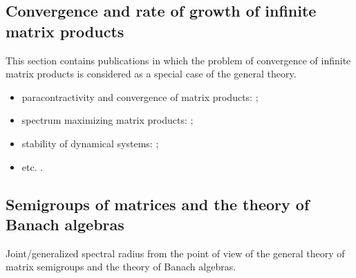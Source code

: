\documentclass[a4paper,fleqn]{article}
\let\cite=\citep
\begin{document}
\subsection*{Convergence and rate of growth of infinite matrix products}
This section contains publications in which the problem of convergence
of infinite matrix products is considered as a special case of the
general theory.

\begin{itemize}
  \item paracontractivity and convergence of matrix products: \cite{BeynEls96,
      BE:EJLA97, NeuSch:ArXiv98, VEB:LAA00, Mojskerc:LAA14, WangCheng:LMA16};
  \item spectrum maximizing matrix products: \cite{BochiLas:SAIMJMAA24,
      CGSZ:LAA10, JSRpack, GugProt:SIAMJMAA16, GugZen:LAA08, Koz:SAIMJMAA25,
      Laskawiec:LAA25, Laskawiec:PhD25, Vladimirov:ArXiv24};
  \item stability of dynamical systems: \cite{Ahmadi08, AhmPar:CDC05,
      Bar:CDC05, BrayTong:TCS79, BrayTong:TCS80, GugZen:LNM14,
      Koz:AiT90:10:e, AKKK:92:e, ShihWP:LAA97, SBKK:CDC97, Shih:LAA99,
      KasBh:2000, BTV:MTNS02};
  \item etc. \cite{AndoShih:SIAM:98, BerWang:LAA92, BEN:ETNA94, CiconePhD11,
      Cohen:MPCPS79, DaubLag:LAA92, DaubLag:LAA01, EF:LAA97, FLS:ETDS19,
      GugZen:LAA01, GurRod:SIAMJMAA97, GugZen:LAA03, Hajnal:MPCPS76,
      Hartfiel02, Holtz:EJLA00, HR:APM12, Koz:DDNS18, Koz:ArXiv20,
      Mate:PAMS98, Mate:FM99, NSch:LAA99, PJ:LAA13, Shen:LAA00,
      ShihPang:AJIFAC08, SU:SIAMJMAA94, Thomas:Arxiv18, Thomas:ArXiv22,
      Thomas:SM26, Vlad:ArXiv16}.
\end{itemize}

\subsection*{Semigroups of matrices and the theory of Banach algebras}
Joint/generalized spectral radius from the point of view of the general
theory of matrix semigroups and the theory of Banach algebras.
\end{document}
